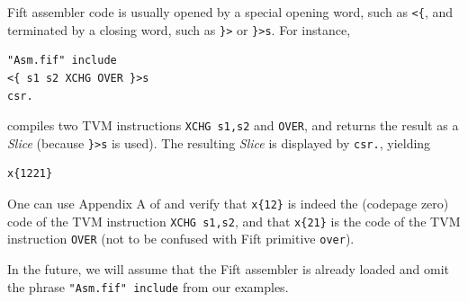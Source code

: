 \documentclass[12pt,oneside]{article}
\begin{document}
Fift assembler code is usually opened by a special opening word, such as {\tt <\{}, and terminated by a closing word, such as {\tt \}>} or {\tt \}>s}. For instance,
\begin{verbatim}
"Asm.fif" include
<{ s1 s2 XCHG OVER }>s
csr.
\end{verbatim}
compiles two TVM instructions {\tt XCHG s1,s2} and {\tt OVER}, and returns the result as a {\em Slice\/} (because {\tt \}>s} is used). The resulting {\em Slice\/} is displayed by {\tt csr.}, yielding
\begin{verbatim}
x{1221}
\end{verbatim}
One can use Appendix A of \cite{TVM} and verify that {\tt x\{12\}} is indeed the (codepage zero) code of the TVM instruction {\tt XCHG s1,s2}, and that {\tt x\{21\}} is the code of the TVM instruction {\tt OVER} (not to be confused with Fift primitive {\tt over}).

In the future, we will assume that the Fift assembler is already loaded and omit the phrase {\tt "Asm.fif" include} from our examples.
\end{document}
